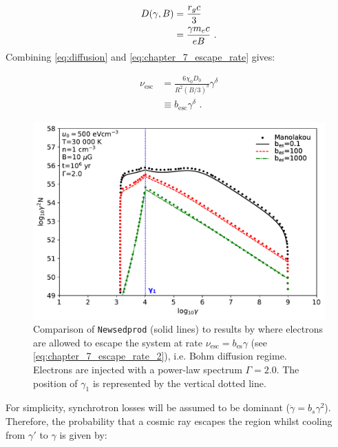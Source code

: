 \begin{equation}
    \begin{aligned}
    D\qty(\gamma,B)&=\frac{r_gc}{3} \\
    &=\frac{\gamma m_e c}{e B}\text{ .}
    \end{aligned}
\end{equation}
\noindent Combining \autoref{eq:diffusion} and \autoref{eq:chapter_7_escape_rate} gives:

\begin{equation}
    \begin{aligned}
    \nu_\text{esc}&=\frac{6\chi_0D_0}{R^2 (B/3)^\delta} \gamma^\delta \\
    &\equiv b_\text{esc} \gamma^\delta\text{ .}
    \end{aligned} \label{eq:chapter_7_escape_rate_2}
\end{equation}

\begin{figure}[b!]
    \centering
    \includegraphics[width=\textwidth]{07_Particle_Evolution/Images/Code/manolakou_ecape.pdf}
    \caption{Comparison of {\tt Newsedprod} (solid lines) to results by \cite{2007A&A...474..689M} where electrons are allowed to escape the system at rate $\nu_\text{esc}= b_\text{es}\gamma$ (see \autoref{eq:chapter_7_escape_rate_2}), i.e. Bohm diffusion regime. Electrons are injected with a power-law spectrum $\Gamma=2.0$. The position of $\gamma_1$ is represented by the vertical dotted line.}
    \label{fig:chapter_7_manolakou_escape}
\end{figure}

For simplicity, synchrotron losses will be assumed to be dominant ($\dot{\gamma}=b_s\gamma^2$). Therefore, the probability that a cosmic ray escapes the region whilst cooling from $\gamma'$ to $\gamma$ is given by:

